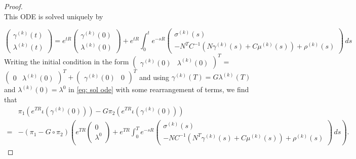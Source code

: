 \documentclass[10pt,a4paper]{amsart}
\begin{document}
\begin{proof}
\begin{equation}
\end{equation}
This ODE is solved uniquely by 

\begin{equation} 
\begin{pmatrix} \gamma^{(k)}(t) \\ \lambda^{(k)}(t) \end{pmatrix} = e^{tR} \begin{pmatrix} \gamma^{(k)}(0) \\ \lambda^{(k)}(0) \end{pmatrix} + e^{tR} \int_0^t e^{-sR} \begin{pmatrix} \sigma^{(k)}(s) \\ - N^TC^{-1} ( N \gamma^{(k)}(s) + C\mu^{(k)}(s)) + \rho^{(k)}(s) \end{pmatrix} \, ds \label{eq: sol ode}
\end{equation}
Writing the initial condition in the form $\begin{pmatrix} \gamma^{(k)}(0)& \lambda^{(k)}(0)\end{pmatrix}^T$ = $\begin{pmatrix} 0 & \lambda^{(k)}(0)\end{pmatrix}^T + \begin{pmatrix} \gamma^{(k)}(0) & 0\end{pmatrix}^T$ and using $\gamma^{(k)}(T) = G \lambda^{(k)}(T)$ and $\lambda^{(k)}(0) = \lambda^0$ in \eqref{eq: sol ode} with some rearrangement of terms, we find that
\begin{equation}
\begin{aligned}
&    \pi_1 (e^{TR} \iota (\gamma^{(k)}(0))) - G \pi_2 (e^{TR} \iota(\gamma^{(k)}(0))) \\ 
= & - (\pi_1 - G \circ \pi_2) \left( e^{TR} \begin{pmatrix} 0 \\ \lambda^0 \end{pmatrix} + e^{TR} \int_0^T e^{-sR} \begin{pmatrix} \sigma^{(k)}(s) \\ - N C^{-1} ( N^T\gamma^{(k)}(s) + C\mu^{(k)}(s)) + \rho^{(k)}(s) \end{pmatrix} \, ds \right).  

\end{aligned}
\end{equation}
\end{proof}
\end{document}
